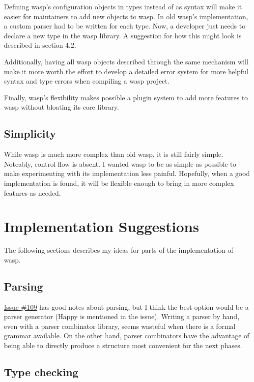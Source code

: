 Defining wasp's configuration objects in types instead of as syntax will make
it easier for maintainers to add new objects to wasp. In old wasp's
implementation, a custom parser had to be written for each type. Now, a
developer just needs to declare a new type in the wasp library. A suggestion
for how this might look is described in section 4.2.

Additionally, having all wasp objects described through the same mechanism will
make it more worth the effort to develop a detailed error system for more
helpful syntax and type errors when compiling a wasp project.

Finally, wasp's flexibility makes possible a plugin system to add more features
to wasp without bloating its core library.

\subsection{Simplicity}

While wasp is much more complex than old wasp, it is still fairly simple.
Noteably, control flow is absent. I wanted wasp to be as simple as possible
to make experimenting with its implementation less painful. Hopefully, when
a good implementation is found, it will be flexible enough to bring
in more complex features as needed.

\section{Implementation Suggestions}

The following sections describes my ideas for parts of the implementation of
wasp.

\subsection{Parsing}

\href{https://github.com/wasp-lang/wasp/issues/109}{Issue \#109} has good notes
about parsing, but I think the best option would be a parser generator (Happy
is mentioned in the issue). Writing a parser by hand, even with a parser
combinator library, seems wasteful when there is a formal grammar available.
On the other hand, parser combinators have the advantage of being able to
directly produce a structure most convenient for the next phases.

\subsection{Type checking}

